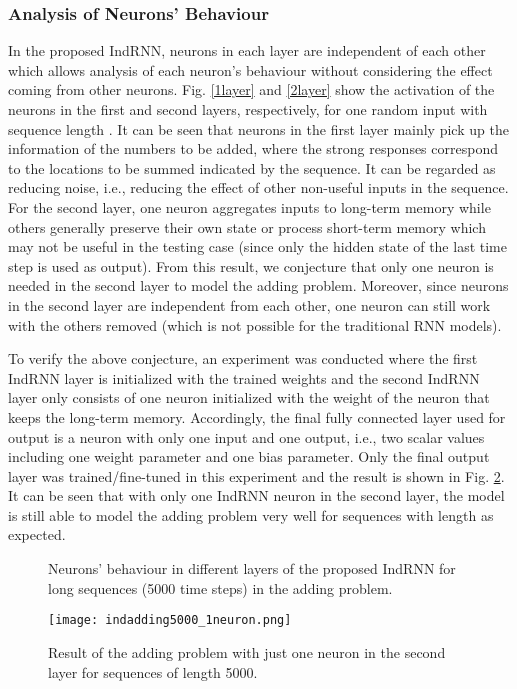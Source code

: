 \documentclass[10pt,twocolumn,letterpaper]{article}
\begin{document}
\subsubsection{Analysis of Neurons' Behaviour}
\label{analysisneuron}
In the proposed IndRNN, neurons in each layer are independent of each other which allows analysis of each neuron's behaviour without considering the effect coming from other neurons. Fig. \ref{1layer} and \ref{2layer} show the activation of the neurons in the first and second layers, respectively, for one random input with sequence length . It can be seen that neurons in the first layer mainly pick up the information of the numbers to be added, where the strong responses correspond to the locations to be summed indicated by the sequence. It can be regarded as reducing noise, i.e., reducing the effect of other non-useful inputs in the sequence. For the second layer, one neuron aggregates inputs to long-term memory while others generally preserve their own state or process short-term memory which may not be useful in the testing case (since only the hidden state of the last time step is used as output). From this result, we conjecture that only one neuron is needed in the second layer to model the adding problem. Moreover, since neurons in the second layer are independent from each other, one neuron can still work with the others removed (which is not possible for the traditional RNN models).

To verify the above conjecture, an experiment was conducted where the first IndRNN layer is initialized with the trained weights and the second IndRNN layer only consists of one neuron initialized with the weight of the neuron that keeps the long-term memory. Accordingly, the final fully connected layer used for output is a neuron with only one input and one output, i.e., two scalar values including one weight parameter and one bias parameter. Only the final output layer was trained/fine-tuned in this experiment and the result is shown in Fig. \ref{resultoneneuron}. It can be seen that with only one IndRNN neuron in the second layer, the model is still able to model the adding problem very well for sequences with length  as expected. 


\begin{figure}[tbp]
	\centering
	\hspace{1cm}
	\caption{Neurons' behaviour in different layers of the proposed IndRNN for long sequences (5000 time steps) in the adding problem.} 
	\label{neuronbehav}
\end{figure}
\begin{figure}[tbp]
\begin{minipage}[t]{1\linewidth}
\centering
    \texttt{[image: indadding5000\_1neuron.png]}\caption{Result of the adding problem with just one neuron in the second layer for sequences of length 5000.} 
    \label{resultoneneuron}
\end{minipage}\end{figure}
\end{document}
